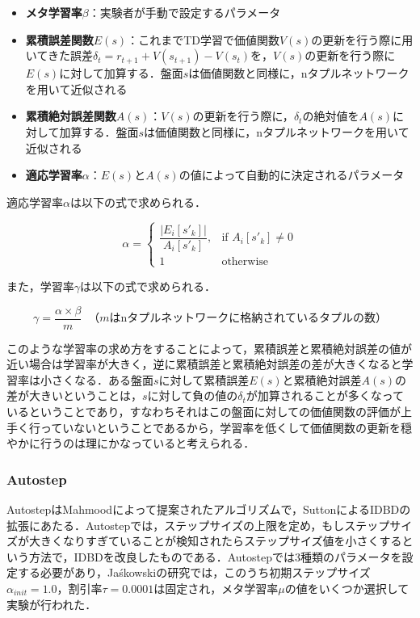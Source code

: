 \documentclass{suribt}
\begin{document}
\begin{itemize}
\item \textbf{メタ学習率${\beta}$}：実験者が手動で設定するパラメータ
\item \textbf{累積誤差関数$E(s)$}：これまでTD学習で価値関数$V(s)$の更新を行う際に用いてきた誤差${\delta}_t = r_{t+1} + V(s_{t+1}) - V(s_t)$を，$V(s)$の更新を行う際に$E(s)$に対して加算する．盤面$s$は価値関数と同様に，nタプルネットワークを用いて近似される
\item \textbf{累積絶対誤差関数$A(s)$}：$V(s)$の更新を行う際に，${\delta}_t$の絶対値を$A(s)$に対して加算する．盤面$s$は価値関数と同様に，nタプルネットワークを用いて近似される
\item \textbf{適応学習率${\alpha}$}：$E(s)$と$A(s)$の値によって自動的に決定されるパラメータ
\end{itemize}

適応学習率${\alpha}$は以下の式で求められる．

\[
{\alpha} = 
\begin{cases}
\dfrac{|E_i[s'_k]|}{A_i[s'_k]}, & \text{if $A_i[s'_k] \neq 0$} \\
1 & \text{otherwise}
\end{cases}
\]

また，学習率${\gamma}$は以下の式で求められる．

\[
{\gamma} = \dfrac{{\alpha} \times {\beta}}{m} \;\; \text{（$m$はnタプルネットワークに格納されているタプルの数）}
\]

このような学習率の求め方をすることによって，累積誤差と累積絶対誤差の値が近い場合は学習率が大きく，逆に累積誤差と累積絶対誤差の差が大きくなると学習率は小さくなる．ある盤面$s$に対して累積誤差$E(s)$と累積絶対誤差$A(s)$の差が大きいということは，$s$に対して負の値の${\delta}_t$が加算されることが多くなっているということであり，すなわちそれはこの盤面に対しての価値関数の評価が上手く行っていないということであるから，学習率を低くして価値関数の更新を穏やかに行うのは理にかなっていると考えられる．

\subsubsection{Autostep}
AutostepはMahmood\cite{Mahmood}によって提案されたアルゴリズムで，SuttonによるIDBD\cite{IDBD}の拡張にあたる．Autostepでは，ステップサイズの上限を定め，もしステップサイズが大きくなりすぎていることが検知されたらステップサイズ値を小さくするという方法で，IDBDを改良したものである．Autostepでは3種類のパラメータを設定する必要があり，Ja\'{s}kowskiの研究では，このうち初期ステップサイズ${\alpha}_{init} = 1.0$，割引率${\tau} = 0.0001$は固定され，メタ学習率${\mu}$の値をいくつか選択して実験が行われた．
\end{document}
